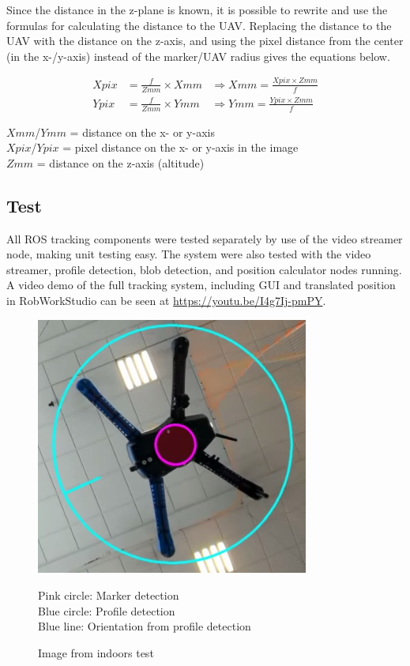 Since the distance in the z-plane is known, it is possible to rewrite and use the formulas for calculating the distance to the UAV. Replacing the distance to the UAV with the distance on the z-axis, and using the pixel distance from the center (in the x-/y-axis) instead of the marker/UAV radius gives the equations below.

\begin{align}
\mathit{Xpix}&= \frac{f}{\mathit{Zmm}}\times \mathit{Xmm} &\Rightarrow \mathit{Xmm}=\frac{\mathit{Xpix}\times \mathit{Zmm}}{f}\nonumber\\
\mathit{Ypix}&= \frac{f}{\mathit{Zmm}}\times \mathit{Ymm} &\Rightarrow \mathit{Ymm}=\frac{\mathit{Ypix}\times \mathit{Zmm}}{f}\nonumber
\end{align}
\begin{center}
	$\mathit{Xmm}$/$\mathit{Ymm}$ = distance on the x- or y-axis\\
	$\mathit{Xpix}$/$\mathit{Ypix}$ = pixel distance on the x- or y-axis in the image\\
	$\mathit{Zmm}$ = distance on the z-axis (altitude)
\end{center}
\subsection{Test}
All ROS tracking components were tested separately by use of the video streamer node, making unit testing easy. The system were also tested with the video streamer, profile detection, blob detection, and position calculator nodes running. A video demo of the full tracking system, including GUI and translated position in RobWorkStudio can be seen at \url{https://youtu.be/I4g7Ij-pmPY}.
\begin{figure}
	\centering
	\includegraphics[width=0.8\textwidth]{imgs/tracking-test-indoors}
	\caption{Image from indoors test}
	Pink circle: Marker detection\\
	Blue circle: Profile detection\\Blue line: Orientation from profile detection
\end{figure}
